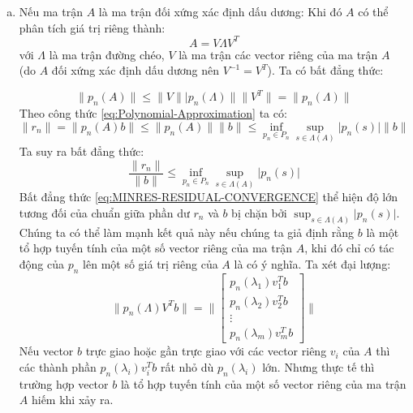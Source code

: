 \documentclass[14pt, a4paper]{article}
\numberwithin{equation}{section}
\numberwithin{algorithm}{section}
\numberwithin{figure}{section}
\numberwithin{dl}{section}
\numberwithin{md}{section}
\numberwithin{bd}{section}
\numberwithin{dn}{section}
\begin{document}
\begin{enumerate}[a)] %
    \item Nếu ma trận $A$ là ma trận đối xứng xác định dấu dương:
    Khi đó $A$ có thể phân tích giá trị riêng thành:
    \begin{equation}
        A = V \Lambda V^T
    \end{equation}
    với $\Lambda$ là ma trận đường chéo, $V$ là ma trận các vector riêng của ma trận $A$ (do $A$ đối xứng xác định dấu dương nên $V^{-1}=V^T$). Ta có bất đẳng thức:

    \begin{equation}
        \lVert p_n(A) \rVert \leq \lVert V \rVert \lvert p_n(\Lambda) \rVert \lVert V^T \rVert = \lVert p_n(\Lambda) \rVert
    \end{equation}
    Theo công thức \ref{eq:Polynomial-Approximation} ta có:
    \begin{equation}
        \lVert r_n \rVert = \lVert p_n(A)b \rVert \leq \lVert p_n(A) \rVert \lVert b \rVert \leq \inf_{p_n \in P_n} \sup_{s \in \Lambda(A)} \lvert p_n(s) \rvert \lVert b \rVert
    \end{equation}
    Ta suy ra bất đẳng thức:
    \begin{equation} \label{eq:MINRES-RESIDUAL-CONVERGENCE}
        \dfrac{\lVert r_n \rVert}{\lVert b \rVert} \leq \inf_{p_n \in P_n} \sup_{s \in \Lambda(A)} \lvert p_n(s) \rvert
    \end{equation}
    Bất đẳng thức \ref{eq:MINRES-RESIDUAL-CONVERGENCE} thể hiện độ lớn tương đối của chuẩn giữa phần dư $r_n$ và $b$ bị chặn bởi $\sup_{s \in \Lambda(A)} \lvert p_n(s) \rvert$. Chúng ta có thể làm mạnh kết quả này nếu chúng ta giả định rằng $b$ là một tổ hợp tuyến tính của một số vector riêng của ma trận $A$, khi đó chỉ có tác động của $p_n$ lên một số giá trị riêng của $A$ là có ý nghĩa.
    Ta xét đại lượng:
    \begin{equation}
        \lVert p_n(\Lambda) V^T b \rVert = \Biggl\lVert \begin{bmatrix} p_n(\lambda_1) v_1^T b \\ p_n(\lambda_2) v_2^T b \\ \vdots \\ p_n(\lambda_m) v_m^T b\end{bmatrix} \Biggl\rVert
    \end{equation}
    Nếu vector $b$ trực giao hoặc gần trực giao với các vector riêng $v_i$ của $A$ thì các thành phần $p_n(\lambda_i)v_i^T b$ rất nhỏ dù $p_n(\lambda_i)$ lớn. Nhưng thực tế thì trường hợp vector $b$ là tổ hợp tuyến tính của một số vector riêng của ma trận $A$ hiếm khi xảy ra.

\end{enumerate}
\end{document}
